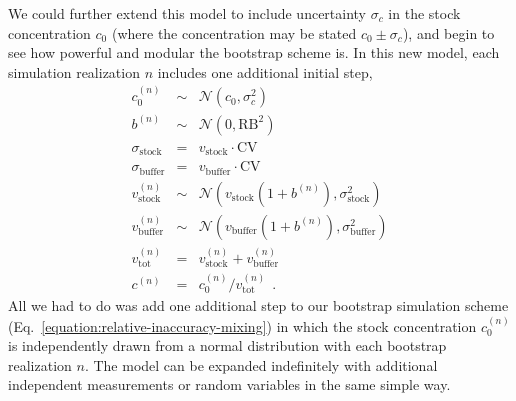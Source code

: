 \documentclass[aps,pre,twocolumn,nofootinbib,superscriptaddress,linenumbers]{revtex4-1}
\begin{document}
We could further extend this model to include uncertainty $\sigma_c$ in the stock concentration $c_0$ (where the concentration may be stated $c_0 \pm \sigma_c$), and begin to see how powerful and modular the bootstrap scheme is.
In this new model, each simulation realization $n$ includes one additional initial step,
\begin{eqnarray}
c_0^{(n)} &\sim& \mathcal{N}(c_0, \sigma_c^2) \nonumber \label{equation:stock-concentration-uncertainty-simple} \\
b^{(n)} &\sim& \mathcal{N}(0, \mathrm{RB}^2) \nonumber \\
\sigma_\mathrm{stock} &=& v_\mathrm{stock} \cdot \mathrm{CV} \nonumber \\
\sigma_\mathrm{buffer} &=& v_\mathrm{buffer} \cdot \mathrm{CV} \nonumber \\
v_\mathrm{stock}^{(n)} &\sim& \mathcal{N}(v_\mathrm{stock} (1 + b^{(n)}) , \sigma_\mathrm{stock}^2) \nonumber \\
v_\mathrm{buffer}^{(n)} &\sim& \mathcal{N}(v_\mathrm{buffer} (1 + b^{(n)}), \sigma_\mathrm{buffer}^2) \nonumber \\
v_\mathrm{tot}^{(n)} &=& v_\mathrm{stock}^{(n)} + v_\mathrm{buffer}^{(n)} \nonumber \\
c^{(n)} &=& c_0^{(n)} / v_\mathrm{tot}^{(n)} \:\: .
\end{eqnarray}
All we had to do was add one additional step to our bootstrap simulation scheme (Eq.~\ref{equation:relative-inaccuracy-mixing}) in which the stock concentration $c_0^{(n)}$ is independently drawn from a normal distribution with each bootstrap realization $n$.
The model can be expanded indefinitely with additional independent measurements or random variables in the same simple way.
\end{document}
